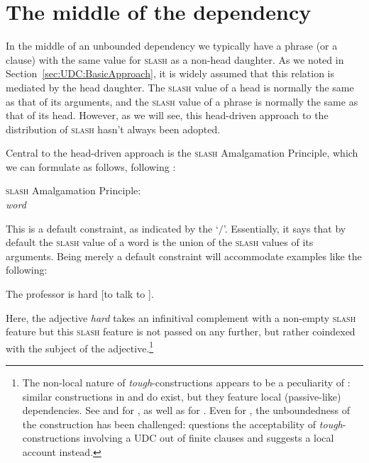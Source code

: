 \documentclass[output=paper
,notxmath 
	        ,collection
	        ,collectionchapter
 	        ,biblatex
                ,babelshorthands
                ,newtxmath
                ,draftmode
                ,colorlinks, citecolor=brown
]{langscibook}
\begin{document}
\section{The middle of the dependency}
\label{sec:UDC:Middle}

In the middle of an unbounded dependency we typically have a phrase
(or a clause) with the same value for \textsc{slash} as a non-head daughter. As
we noted in Section~\ref{sec:UDC:BasicApproach}, it is widely assumed
that this relation is mediated by the head daughter. The \textsc{slash} value
of a head is normally the same as that of its arguments, and the \textsc{slash}
value of a phrase is normally the same as that of its head. However,
as we will see, this head-driven approach to the distribution of \textsc{slash}
hasn't always been adopted.

Central to the head-driven approach is the \textsc{slash} Amalgamation Principle,
which we can formulate as follows, following \citet[199]{Ginzburg:Sag:01}:

\ea
\label{fig:UDC:32}
\textsc{slash} Amalgamation Principle:\\
   \textit{word} \impl
{}
\z

\noindent
This is a default constraint, as indicated by the `$\slash$'\is{$\slash$}. Essentially,
it says that by default the \textsc{slash} value of a word
is the union of the \textsc{slash} values of its arguments.  Being
merely a
default constraint will accommodate examples like the following:

\begin{exe}
\ex \label{ex:UDC:33}
The professor is hard [to talk to \trace{}].
\end{exe}

\noindent
Here, the adjective \emph{hard} takes an infinitival complement with a
non-empty \textsc{slash} feature 
but this  \textsc{slash} feature
is not passed on any further, but rather coindexed with the subject of
the adjective.\footnote{The
  non-local nature of \textit{tough}-constructions appears to be a
  peculiarity of : similar constructions in  and 
  do exist, but they feature local (passive-like) dependencies. See
  \citet{abeille_a-godard_d-miller_p-sag_i95} and
  \citet{aguila-multner18} for , as well as \citet[Section~3.1.5]{Mueller:02b}
  for . Even for , the unboundedness of the construction
  has been challenged: \citet{Grover:95} questions the acceptability
  of  \textit{tough}-constructions involving a UDC out of
  finite clauses and suggests a local account instead.}
\end{document}
